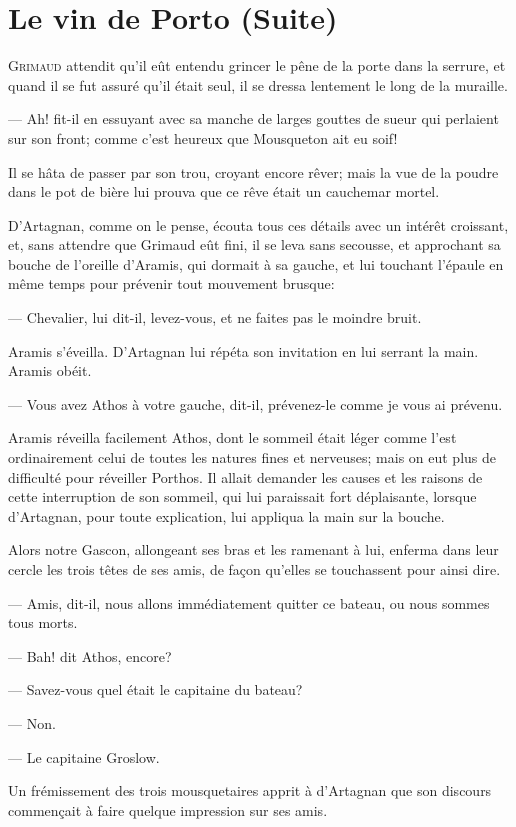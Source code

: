 \chapter{Le vin de Porto (Suite)}

\lettrine{G}{rimaud} attendit qu'il eût entendu grincer le pêne de la porte dans la serrure, et quand il se fut assuré qu'il était seul, il se dressa lentement le long de la muraille.

\zz
— Ah! fit-il en essuyant avec sa manche de larges gouttes de sueur qui perlaient sur son front; comme c'est heureux que Mousqueton ait eu soif!

Il se hâta de passer par son trou, croyant encore rêver; mais la vue de la poudre dans le pot de bière lui prouva que ce rêve était un cauchemar mortel.

D'Artagnan, comme on le pense, écouta tous ces détails avec un intérêt croissant, et, sans attendre que Grimaud eût fini, il se leva sans secousse, et approchant sa bouche de l'oreille d'Aramis, qui dormait à sa gauche, et lui touchant l'épaule en même temps pour prévenir tout mouvement brusque:

— Chevalier, lui dit-il, levez-vous, et ne faites pas le moindre bruit.

Aramis s'éveilla. D'Artagnan lui répéta son invitation en lui serrant la main. Aramis obéit.

— Vous avez Athos à votre gauche, dit-il, prévenez-le comme je vous ai prévenu.

Aramis réveilla facilement Athos, dont le sommeil était léger comme l'est ordinairement celui de toutes les natures fines et nerveuses; mais on eut plus de difficulté pour réveiller Porthos. Il allait demander les causes et les raisons de cette interruption de son sommeil, qui lui paraissait fort déplaisante, lorsque d'Artagnan, pour toute explication, lui appliqua la main sur la bouche.

Alors notre Gascon, allongeant ses bras et les ramenant à lui, enferma dans leur cercle les trois têtes de ses amis, de façon qu'elles se touchassent pour ainsi dire.

— Amis, dit-il, nous allons immédiatement quitter ce bateau, ou nous sommes tous morts.

— Bah! dit Athos, encore?

— Savez-vous quel était le capitaine du bateau?

— Non.

— Le capitaine Groslow.

Un frémissement des trois mousquetaires apprit à d'Artagnan que son discours commençait à faire quelque impression sur ses amis.

